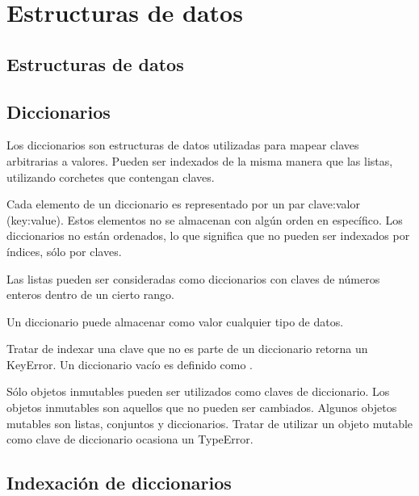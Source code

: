\documentclass{report}
\begin{document}
\clearpage\chapter{Estructuras de datos}

\section{Estructuras de datos}


\section{Diccionarios}


Los diccionarios son estructuras de datos utilizadas para mapear claves arbitrarias a valores. Pueden ser indexados de la misma manera que las listas, utilizando corchetes que contengan claves.


Cada elemento de un diccionario es representado por un par clave:valor (key:value). Estos elementos no se almacenan con algún orden en específico. Los diccionarios no están ordenados, lo que significa que no pueden ser indexados por índices, sólo por claves.\smallskip

Las listas pueden ser consideradas como diccionarios con claves de números enteros dentro de un cierto rango.


Un diccionario puede almacenar como valor cualquier tipo de datos.


Tratar de indexar una clave que no es parte de un diccionario retorna un KeyError.
Un diccionario vacío es definido como {}.


Sólo objetos inmutables pueden ser utilizados como claves de diccionario. Los objetos inmutables son aquellos que no pueden ser cambiados. Algunos objetos mutables son listas, conjuntos y diccionarios. Tratar de utilizar un objeto mutable como clave de diccionario ocasiona un TypeError.

\section{Indexación de diccionarios}
\end{document}
